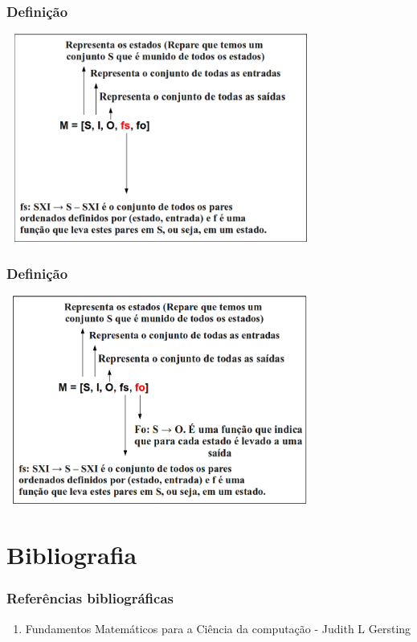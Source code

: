 \documentclass{beamer}
\begin{document}
\begin{frame}
  \frametitle{Definição}
    \includegraphics[height=2.7in, width=4in]{images/entendendo_definicao_5.png}
\end{frame}

\begin{frame}
  \frametitle{Definição}
    \includegraphics[height=2.7in, width=4in]{images/entendendo_definicao_6.png}
\end{frame}

\section{Bibliografia}
\begin{frame}
  \frametitle{Referências bibliográficas}
  \begin{enumerate}
    \item Fundamentos Matemáticos para a Ciência da computação - Judith L 
      Gersting
    \end{enumerate}
\end{frame}
\end{document}
